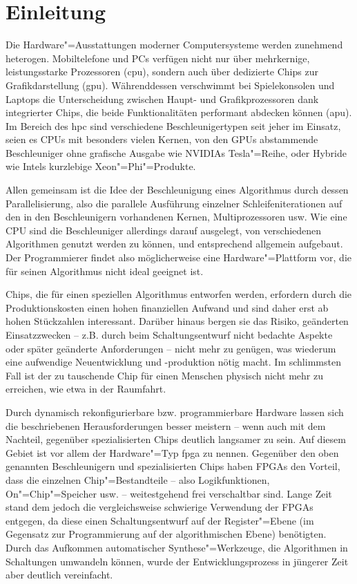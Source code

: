 \chapter{Einleitung}\label{einleitung}

Die Hardware"=Ausstattungen moderner Computersysteme werden zunehmend heterogen.
Mobiltelefone und PCs verfügen nicht nur über mehrkernige, leistungsstarke
Prozessoren (\gls{cpu}), sondern auch über dedizierte Chips zur
Grafikdarstellung (\gls{gpu}). Währenddessen verschwimmt bei Spielekonsolen und
Laptops die Unterscheidung zwischen Haupt- und Grafikprozessoren dank
integrierter Chips, die beide Funktionalitäten performant abdecken können
(\gls{apu}). Im Bereich des \gls{hpc} sind verschiedene Beschleunigertypen seit
jeher im Einsatz, seien es CPUs mit besonders vielen Kernen, von den GPUs
abstammende Beschleuniger ohne grafische Ausgabe wie NVIDIAs Tesla"=Reihe, oder
Hybride wie Intels kurzlebige Xeon"=Phi"=Produkte.

Allen gemeinsam ist die Idee der Beschleunigung eines Algorithmus durch dessen
Parallelisierung, also die parallele Ausführung einzelner Schleifeniterationen
auf den in den Beschleunigern vorhandenen Kernen, Multiprozessoren usw. Wie eine
CPU sind die Beschleuniger allerdings darauf ausgelegt, von verschiedenen
Algorithmen genutzt werden zu können, und entsprechend allgemein aufgebaut. Der
Programmierer findet also möglicherweise eine Hardware"=Plattform vor, die für
seinen Algorithmus nicht ideal geeignet ist.

Chips, die für einen speziellen Algorithmus entworfen werden, erfordern durch
die Produktionskosten einen hohen finanziellen Aufwand und sind daher erst ab
hohen Stückzahlen interessant. Darüber hinaus bergen sie das Risiko, geänderten
Einsatzzwecken -- z.B. durch beim Schaltungsentwurf nicht bedachte Aspekte oder
später geänderte Anforderungen -- nicht mehr zu genügen, was wiederum eine
aufwendige Neuentwicklung und -produktion nötig macht. Im schlimmsten Fall ist
der zu tauschende Chip für einen Menschen physisch nicht mehr zu erreichen, wie
etwa in der Raumfahrt.

Durch dynamisch rekonfigurierbare bzw. programmierbare Hardware lassen sich die
beschriebenen Herausforderungen besser meistern -- wenn auch mit dem Nachteil,
gegenüber spezialisierten Chips deutlich langsamer zu sein. Auf diesem Gebiet
ist vor allem der Hardware"=Typ \gls{fpga} zu nennen. Gegenüber den oben
genannten Beschleunigern und spezialisierten Chips haben FPGAs den Vorteil, dass
die einzelnen Chip"=Bestandteile -- also Logikfunktionen, On"=Chip"=Speicher
usw. -- weitestgehend frei verschaltbar sind. 
Lange Zeit stand dem jedoch die vergleichsweise schwierige Verwendung der
FPGAs entgegen, da diese einen Schaltungsentwurf auf der Register"=Ebene (im
Gegensatz zur Programmierung auf der algorithmischen Ebene) benötigten. Durch
das Aufkommen automatischer Synthese"=Werkzeuge, die Algorithmen in Schaltungen
umwandeln können, wurde der Entwicklungsprozess in jüngerer Zeit
aber deutlich vereinfacht.

